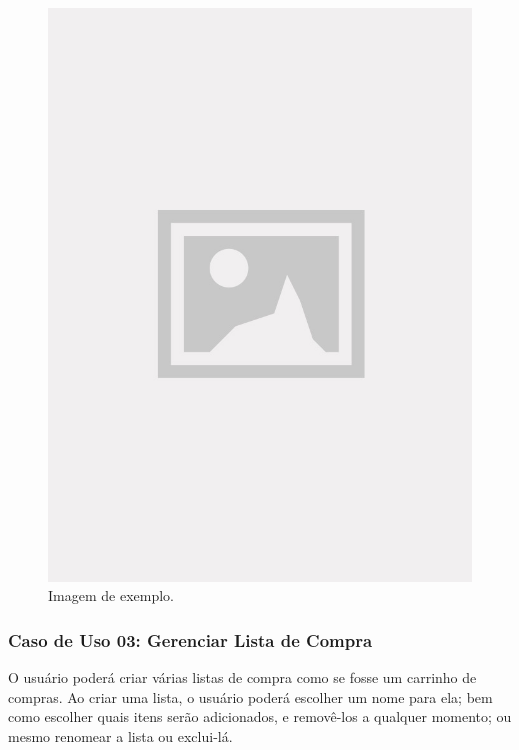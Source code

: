\begin{figure}[!htb]
\centering
\caption{Imagem de exemplo.}
\includegraphics[width=\linewidth]{figuras/placeholder.jpg}
\end{figure}

\subsubsection{Caso de Uso 03: Gerenciar Lista de Compra}

O usuário poderá criar várias listas de compra como se fosse um carrinho de compras. Ao criar uma lista, o usuário poderá escolher um nome para ela; bem como escolher quais itens serão adicionados, e removê-los a qualquer momento; ou mesmo renomear a lista ou exclui-lá.

